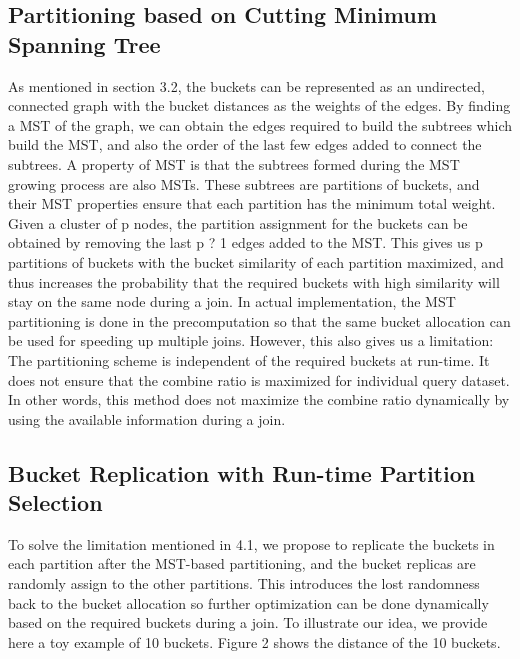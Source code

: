 \documentclass{vldb}
\begin{document}
\subsection{Partitioning based on Cutting Minimum Spanning Tree}
As mentioned in section 3.2, the buckets can be represented as an undirected, connected graph with the bucket distances as the weights of the edges. By finding a MST of the graph, we can obtain the edges required to build the subtrees which build the MST, and also the order of the last few edges added to connect the subtrees. A property of MST is that the subtrees formed during the MST growing process are also MSTs. These subtrees are partitions of buckets, and their MST properties ensure that each partition has the minimum total weight. Given a cluster of p nodes, the partition assignment for the buckets can be obtained by removing the last p ? 1 edges added to the MST. This gives us p partitions of buckets with the bucket similarity of each partition maximized, and thus increases the probability that the required buckets with high similarity will stay on the same node during a join.
	In actual implementation, the MST partitioning is done in the precomputation so that the same bucket allocation can be used for speeding up multiple joins. However, this also gives us a limitation: The partitioning scheme is independent of the required buckets at run-time. It does not ensure that the combine ratio is maximized for individual query dataset. In other words, this method does not maximize the combine ratio dynamically by using the available information during a join.

\subsection{Bucket Replication with Run-time Partition Selection}
To solve the limitation mentioned in 4.1, we propose to replicate the buckets in each partition after the MST-based partitioning, and the bucket replicas are randomly assign to the other partitions. This introduces the lost randomness back to the bucket allocation so further optimization can be done dynamically based on the required buckets during a join. To illustrate our idea, we provide here a toy example of 10 buckets. Figure 2 shows the distance of the 10 buckets.
\end{document}
